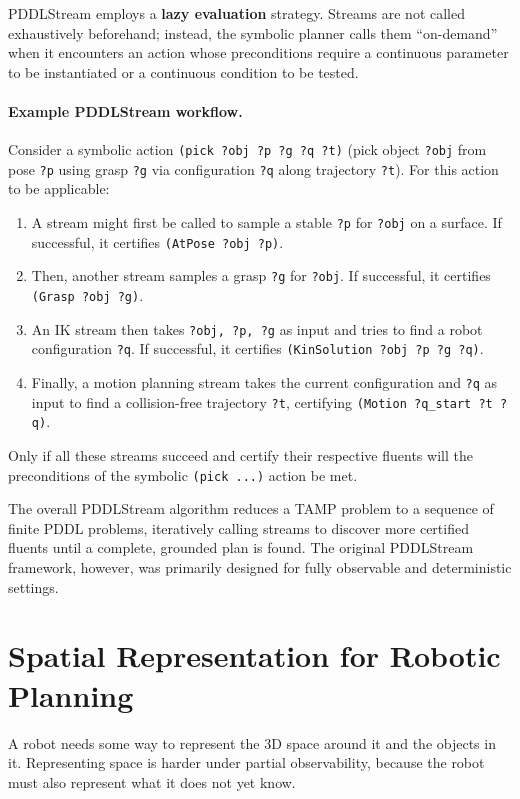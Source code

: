PDDLStream employs a \textbf{lazy evaluation} strategy. Streams are not called exhaustively beforehand; instead, the symbolic planner calls them ``on-demand'' when it encounters an action whose preconditions require a continuous parameter to be instantiated or a continuous condition to be tested.

\paragraph{Example PDDLStream workflow.}
Consider a symbolic action \texttt{(pick ?obj ?p ?g ?q ?t)} (pick object \texttt{?obj} from pose \texttt{?p} using grasp \texttt{?g} via configuration \texttt{?q} along trajectory \texttt{?t}). For this action to be applicable:
\begin{enumerate}
    \item A stream might first be called to sample a stable \texttt{?p} for \texttt{?obj} on a surface. If successful, it certifies \texttt{(AtPose ?obj ?p)}.
    \item Then, another stream samples a grasp \texttt{?g} for \texttt{?obj}. If successful, it certifies \texttt{(Grasp ?obj ?g)}.
    \item An IK stream then takes \texttt{?obj, ?p, ?g} as input and tries to find a robot configuration \texttt{?q}. If successful, it certifies \texttt{(KinSolution ?obj ?p ?g ?q)}.
    \item Finally, a motion planning stream takes the current configuration and \texttt{?q} as input to find a collision-free trajectory \texttt{?t}, certifying \texttt{(Motion ?q\_start ?t ?q)}.
\end{enumerate}
Only if all these streams succeed and certify their respective fluents will the preconditions of the symbolic \texttt{(pick ...)} action be met.

The overall PDDLStream algorithm reduces a TAMP problem to a sequence of finite PDDL problems, iteratively calling streams to discover more certified fluents until a complete, grounded plan is found. The original PDDLStream framework, however, was primarily designed for fully observable and deterministic settings.

\section{Spatial Representation for Robotic Planning}
\label{sec:spatial_representation}

A robot needs some way to represent the 3D space around it and the objects in it. Representing space is harder under partial observability, because the robot must also represent what it does not yet know.

